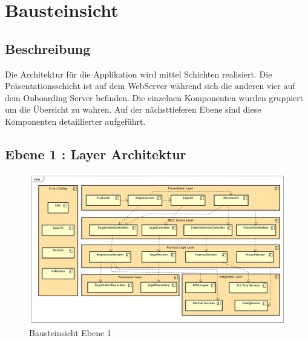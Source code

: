 \graphicspath{{./images/}}

\chapter{Bausteinsicht}

\section{Beschreibung}

Die Architektur für die Applikation wird mittel Schichten realisiert. Die Präsentationsschicht ist auf dem WebServer während sich die anderen vier auf dem Onboarding Server befinden. Die einzelnen Komponenten wurden gruppiert um die Übersicht zu wahren. Auf der nächsttieferen Ebene sind diese Komponenten detaillierter aufgeführt.

\begin{landscape}
\section{Ebene 1 : Layer Architektur}

\begin{figure}[H]
	\centering
	\includegraphics[scale=0.6]{ComponentLevel1.png}
	\caption{Bausteinsicht Ebene 1}
\end{figure}

\end{landscape}
\restoregeometry


